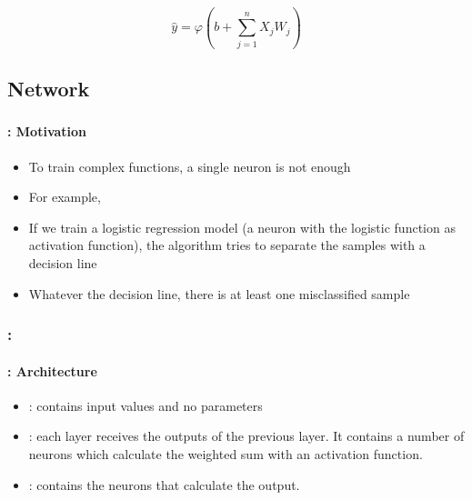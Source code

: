 \documentclass[xcolor=table]{beamer}
\begin{document}
\begin{frame}
	\frametitle{\insertshortsubtitle}
	\framesubtitle{\insertsection}

\begin{center}
\end{center}

\[\hat{y} = \varphi (b + \sum_{j=1}^n X_j W_j)\]

\end{frame}

\subsection{Network}

\begin{frame}
	\frametitle{\insertshortsubtitle}
	\framesubtitle{\insertsection: Motivation}
	
	\begin{minipage}{0.59\textwidth}
		\begin{itemize}
			\item To train complex functions, a single neuron is not enough
			\item For example, 
			\item If we train a logistic regression model (a neuron with the logistic function as activation function), the algorithm tries to separate the samples with a decision line
			\item Whatever the decision line, there is at least one misclassified sample
		\end{itemize}
	\end{minipage}
	\begin{minipage}{0.4\textwidth}
	\end{minipage}

\end{frame}

\begin{frame}
	\frametitle{\insertshortsubtitle: \insertsection}
	\framesubtitle{\insertsubsection: Architecture}
	
	\begin{minipage}{0.59\textwidth}
		\begin{itemize}
			\item {}: contains input values and no parameters
			\item {}: each layer receives the outputs of the previous layer.
			It contains a number of neurons which calculate the weighted sum with an activation function.
			\item {}: contains the neurons that calculate the output.
		\end{itemize}
	\end{minipage}
	\begin{minipage}{0.4\textwidth}
	\end{minipage}

\end{frame}
\end{document}

